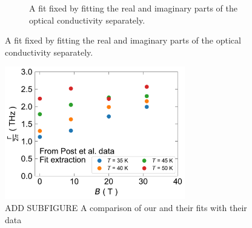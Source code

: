 \begin{figure}
\begin{subfigure}{0.49\textwidth}
        \caption{A fit fixed by fitting the real and imaginary parts of the optical conductivity
            separately.}
        \label{fig:drude_fit_bad}
    \end{subfigure}
\end{figure}


\begin{figure}
    \centering
    \includegraphics[width=0.7\textwidth]{figures/fitting_Drude_extracted_Gamma.pdf}
    \caption{ADD SUBFIGURE A comparison of our and their fits with their data}
    \label{fig:drude_fit_good}
\end{figure}
